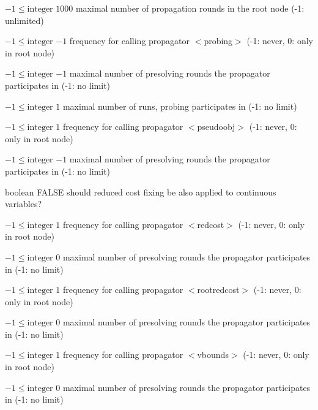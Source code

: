 %
{$-1\leq\textrm{integer}$}%
{$1000$}%
{maximal number of propagation rounds in the root node (-1: unlimited)}%
{}

%
{$-1\leq\textrm{integer}$}%
{$-1$}%
{frequency for calling propagator $<$probing$>$ (-1: never, 0: only in root node)}%
{}

%
{$-1\leq\textrm{integer}$}%
{$-1$}%
{maximal number of presolving rounds the propagator participates in (-1: no limit)}%
{}

%
{$-1\leq\textrm{integer}$}%
{$1$}%
{maximal number of runs, probing participates in (-1: no limit)}%
{}

%
{$-1\leq\textrm{integer}$}%
{$1$}%
{frequency for calling propagator $<$pseudoobj$>$ (-1: never, 0: only in root node)}%
{}

%
{$-1\leq\textrm{integer}$}%
{$-1$}%
{maximal number of presolving rounds the propagator participates in (-1: no limit)}%
{}

%
{boolean}%
{FALSE}%
{should reduced cost fixing be also applied to continuous variables?}%
{}

%
{$-1\leq\textrm{integer}$}%
{$1$}%
{frequency for calling propagator $<$redcost$>$ (-1: never, 0: only in root node)}%
{}

%
{$-1\leq\textrm{integer}$}%
{$0$}%
{maximal number of presolving rounds the propagator participates in (-1: no limit)}%
{}

%
{$-1\leq\textrm{integer}$}%
{$1$}%
{frequency for calling propagator $<$rootredcost$>$ (-1: never, 0: only in root node)}%
{}

%
{$-1\leq\textrm{integer}$}%
{$0$}%
{maximal number of presolving rounds the propagator participates in (-1: no limit)}%
{}

%
{$-1\leq\textrm{integer}$}%
{$1$}%
{frequency for calling propagator $<$vbounds$>$ (-1: never, 0: only in root node)}%
{}

%
{$-1\leq\textrm{integer}$}%
{$0$}%
{maximal number of presolving rounds the propagator participates in (-1: no limit)}%
{}

